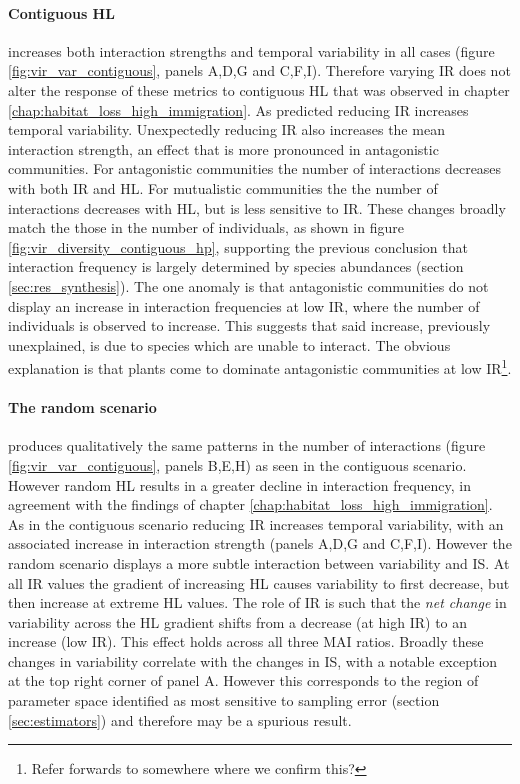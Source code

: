\paragraph*{Contiguous HL} increases both interaction strengths and temporal variability in all cases (figure \ref{fig:vir_var_contiguous}, panels A,D,G and C,F,I). Therefore varying IR does not alter the response of these metrics to contiguous HL that was observed in chapter \ref{chap:habitat_loss_high_immigration}. As predicted reducing IR increases temporal variability. Unexpectedly reducing IR also increases the mean interaction strength, an effect that is more pronounced in antagonistic communities. For antagonistic communities the number of interactions decreases with both IR and HL. For mutualistic communities the the number of interactions decreases with HL, but is less sensitive to IR. These changes broadly match the those in the number of individuals, as shown in figure \ref{fig:vir_diversity_contiguous_hp}, supporting the previous conclusion that interaction frequency is largely determined by species abundances (section \ref{sec:res_synthesis}). The one anomaly is that antagonistic communities do not display an increase in interaction frequencies at low IR, where the number of individuals is observed to increase. This suggests that said increase, previously unexplained, is due to species which are unable to interact. The obvious explanation is that plants come to dominate antagonistic communities at low IR\footnote{Refer forwards to somewhere where we confirm this?}.

\paragraph*{The random scenario} produces qualitatively the same patterns in the number of interactions (figure \ref{fig:vir_var_contiguous}, panels B,E,H) as seen in the contiguous scenario. However random HL results in a greater decline in interaction frequency, in agreement with the findings of chapter \ref{chap:habitat_loss_high_immigration}. As in the contiguous scenario reducing IR increases temporal variability, with an associated increase in interaction strength (panels A,D,G and C,F,I). However the random scenario displays a more subtle interaction between variability and IS. At all IR values the gradient of increasing HL causes variability to first decrease, but then increase at extreme HL values. The role of IR is such that the \emph{net change} in variability across the HL gradient shifts from a decrease (at high IR) to an increase (low IR). This effect holds across all three MAI ratios. Broadly these changes in variability correlate with the changes in IS, with a notable exception at the top right corner of panel A. However this corresponds to the region of parameter space identified as most sensitive to sampling error (section \ref{sec:estimators}) and therefore may be a spurious result.

